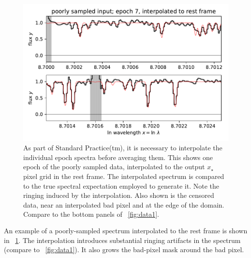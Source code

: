 \documentclass[modern]{aastex631}
\newlength{\figurewidth}
\begin{document}
\begin{figure}[t!]
    \begin{mdframed}\begin{center}
    \includegraphics[width=\figurewidth]{notebooks/datazoom_interpolated.pdf}
    \end{center}
    \caption{As part of Standard Practice(tm), it is necessary to interpolate the individual epoch spectra before averaging them. This shows one epoch of the poorly sampled data, interpolated to the output $x_\star$ pixel grid in the rest frame. The interpolated spectrum is compared to the true spectral expectation employed to generate it. Note the ringing induced by the interpolation. Also shown is the censored data, near an interpolated bad pixel and at the edge of the domain. Compare to the bottom panels of \figurename~\ref{fig:data1}.\label{fig:interpolated}}
    \end{mdframed}
\end{figure}
An example of a poorly-sampled spectrum interpolated to the rest frame is shown in \figurename~\ref{fig:interpolated}.
The interpolation introduces substantial ringing artifacts in the spectrum (compare to \figurename~\ref{fig:data1}).
It also grows the bad-pixel mask around the bad pixel.
\end{document}
